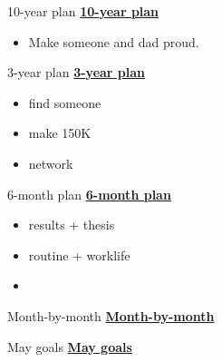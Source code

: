 \begin{multicols}{4}
\begin{columns}
\ifdefined\POSTER
  \begin{column}{0.5\columnwidth}
    \begin{block}{10-year plan}   %
\else
 \underline{\bf 10-year plan}
\fi
      \begin{itemize}
      \item \small Make someone and dad proud.
      \end{itemize}
\ifdefined\POSTER
    \end{block}
\fi

\ifdefined\POSTER
    \begin{block}{3-year plan}
\else
\underline{\bf 3-year plan}
\fi
      \begin{itemize}
      \item \small find someone
      \item \small make 150K
      \item \small network
      \end{itemize}
\ifdefined\POSTER
    \end{block}
\fi

\ifdefined\POSTER
    \begin{block}{6-month plan}
\else
\underline{\bf 6-month plan}
\fi
        \begin{itemize}
          \small \item \small results + thesis
          \item \small routine + worklife
          \item \small
          \end{itemize}
\ifdefined\POSTER
    \end{block}
\fi

\ifdefined\POSTER
    \begin{block}{Month-by-month}
\else
\underline{\bf Month-by-month}
\fi
      \begin{itemize}

\ifdefined\POSTER
\begin{block}{May goals}
\else
\underline{\bf May goals}\\
\fi


\end{block}
\end{itemize}
\end{block}
\end{column}
\end{columns}
\end{multicols}
